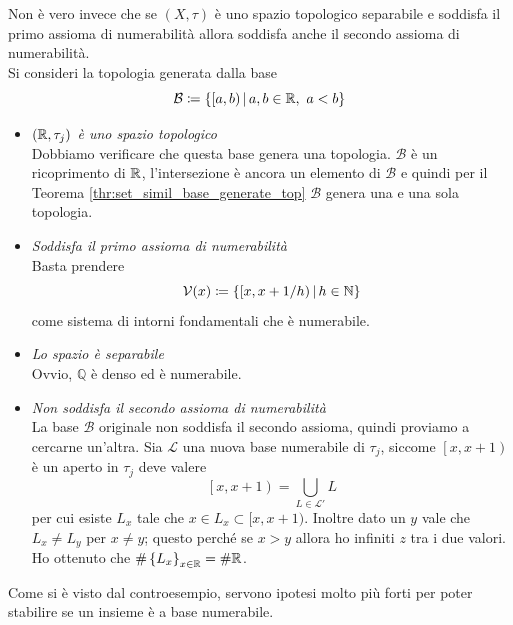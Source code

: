 \begin{remark}[Topologia $j_d$]
	Non è vero invece che se $(X,\tau)$ è uno spazio topologico separabile e soddisfa il primo assioma di numerabilità allora soddisfa anche il secondo assioma di numerabilità. \\
	Si consideri la topologia generata dalla base
	\begin{equation*}
		\mathcal{B} \coloneqq \left\{ \left[a,b\right) \,\middle|\, a,b \in \mathbb{R},\ a < b \right\}
	\end{equation*}  
	\begin{itemize}
		\item \textit{$(\mathbb{R}, \tau_j)$ è uno spazio topologico} \\ Dobbiamo verificare che questa base genera una topologia. $\mathcal{B}$ è un ricoprimento di $\mathbb{R}$, l'intersezione è ancora un elemento di $\mathcal{B}$ e quindi per il Teorema \ref{thr:set_simil_base_generate_top} $\mathcal{B}$ genera una e una sola topologia.
		\item \textit{Soddisfa il primo assioma di numerabilità} \\ Basta prendere
		\begin{equation*}
		\mathcal{V}(x) \coloneqq \left\{\left[x, x+1/h\right) \,\middle|\, h \in \mathbb{N} \right\}
		\end{equation*}
		come sistema di intorni fondamentali che è numerabile.
		\item \textit{Lo spazio è separabile} \\ Ovvio, $\mathbb{Q}$ è denso ed è numerabile.
		\item \textit{Non soddisfa il secondo assioma di numerabilità}\\
		La base $\mathcal{B}$ originale non soddisfa il secondo assioma, quindi proviamo a cercarne un'altra. Sia $\mathcal{L}$ una nuova base numerabile di $\tau_j$, siccome $\left[x, x+1\right)$ è un aperto in $\tau_j$ deve valere
		\begin{equation*}
		\left[x, x+1\right) = \bigcup_{L \in \mathcal{L}'} L
		\end{equation*}
		 per cui esiste $L_x$ tale che $x \in L_x \subset [x,x+1)$. Inoltre dato un $y$ vale che $L_x \neq L_y$ per $x \neq y$; questo perché se $x > y$ allora ho infiniti $z$ tra i due valori. Ho ottenuto che $\# \left\{L_x\right\}_{x\in \mathbb{R}} = \# \mathbb{R}$.
	\end{itemize}
	 
\end{remark}

Come si è visto dal controesempio, servono ipotesi molto più forti per poter stabilire se un insieme è a base numerabile.

